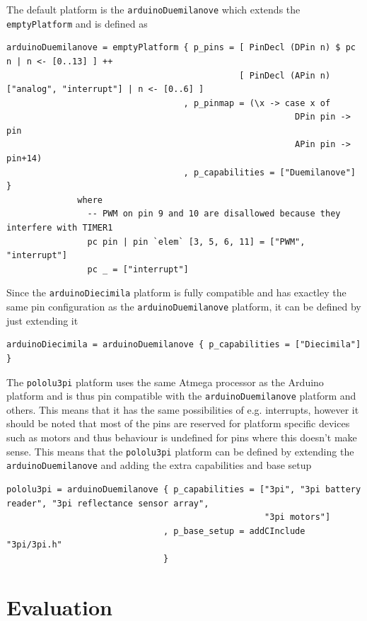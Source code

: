 \documentclass[a4paper, oneside, final]{memoir}
\begin{document}
The default platform is the \texttt{arduinoDuemilanove} which extends the
\texttt{emptyPlatform} and is defined as

\begin{verbatim}
arduinoDuemilanove = emptyPlatform { p_pins = [ PinDecl (DPin n) $ pc n | n <- [0..13] ] ++
                                              [ PinDecl (APin n) ["analog", "interrupt"] | n <- [0..6] ]
                                   , p_pinmap = (\x -> case x of
                                                         DPin pin -> pin
                                                         APin pin -> pin+14)
                                   , p_capabilities = ["Duemilanove"] }
              where
                -- PWM on pin 9 and 10 are disallowed because they interfere with TIMER1
                pc pin | pin `elem` [3, 5, 6, 11] = ["PWM", "interrupt"] 
                pc _ = ["interrupt"]
\end{verbatim}

Since the \texttt{arduinoDiecimila} platform is fully compatible and has
exactley the same pin configuration as the \texttt{arduinoDuemilanove} platform, it can
be defined by just extending it

\begin{verbatim}
arduinoDiecimila = arduinoDuemilanove { p_capabilities = ["Diecimila"] }
\end{verbatim}

The \texttt{pololu3pi} platform uses the same Atmega processor as the Arduino
platform and is thus pin compatible with the \texttt{arduinoDuemilanove}
platform and others. This means that it has the same possibilities of e.g.
interrupts, however it should be noted that most of the pins are reserved
\cite{3pi_pin_mapping} for platform specific devices such as motors and thus
behaviour is undefined for pins where this doesn't make sense. This means that
the \texttt{pololu3pi} platform can be defined by extending the
\texttt{arduinoDuemilanove} and adding the extra capabilities and base setup

\begin{verbatim}
pololu3pi = arduinoDuemilanove { p_capabilities = ["3pi", "3pi battery reader", "3pi reflectance sensor array",
                                                   "3pi motors"]
                               , p_base_setup = addCInclude "3pi/3pi.h"
                               }
\end{verbatim}


\chapter{Evaluation}
\label{chap:evaluation}
\end{document}

